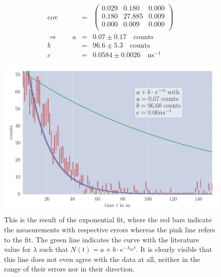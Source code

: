 \begin{align}
    \mathrm{cov}&=& 
    \begin{pmatrix}
        0.029 &0.180 &0.000 \\
        0.180 &27.885 &0.009 \\
        0.000 &0.009 &0.000 \\
    \end{pmatrix}
\\ \Rightarrow \qquad
    a &=& 0.07 \pm 0.17 \quad \mathrm{counts}\\
    b &=& 96.6 \pm 5.3 \quad \mathrm{counts}\\
    c &=& 0.0584 \pm 0.0026 \quad \mathrm{ns}^{-1}
\end{align}



\begin{figure}[htpb]
    \centering
    \includegraphics[width=0.8\linewidth]{analysis/figures/plot4_1_reg}
    \caption{This is the result of the exponential fit, where the red bars indicate the measurements with respective
errors whereas the pink line refers to the fit.
The green line indicates the curve with the literature value for $\lambda$ such 
that $N(t) = a + b\cdot e^{-\lambda_{lit} t}$. It is clearly visible that this line does not even agree with
the data at all, neither in the range of their errors nor in their direction. }
    \label{fig:name}
\end{figure}

